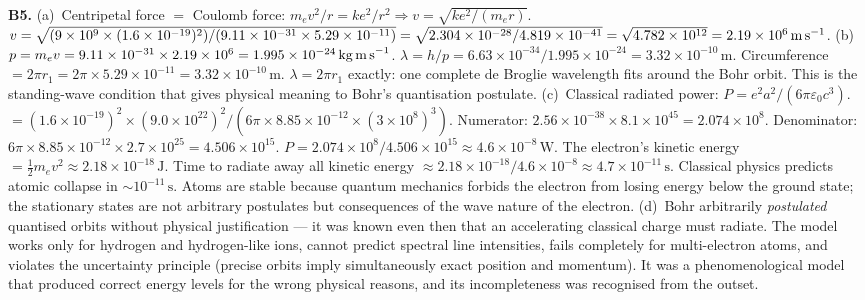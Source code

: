 \textbf{B5.}
(a)~Centripetal force $=$ Coulomb force:
$m_ev^2/r=ke^2/r^2\Rightarrow v=\sqrt{ke^2/(m_er)}$.
$v=\sqrt{(9\times10^9\times(1.6\times10^{-19})^2)/
(9.11\times10^{-31}\times5.29\times10^{-11})}
=\sqrt{2.304\times10^{-28}/4.819\times10^{-41}}
=\sqrt{4.782\times10^{12}}
=2.19\times10^6\,\text{m\,s}^{-1}$. \quad
(b)~$p=m_ev=9.11\times10^{-31}\times2.19\times10^6
=1.995\times10^{-24}\,\text{kg\,m\,s}^{-1}$.
$\lambda=h/p=6.63\times10^{-34}/1.995\times10^{-24}
=3.32\times10^{-10}\,\text{m}$.
Circumference $=2\pi r_1
=2\pi\times5.29\times10^{-11}
=3.32\times10^{-10}\,\text{m}$.
$\lambda=2\pi r_1$ exactly: one complete de Broglie
wavelength fits around the Bohr orbit. This is the
standing-wave condition that gives physical meaning to
Bohr's quantisation postulate. \quad
(c)~Classical radiated power:
$P=e^2a^2/(6\pi\varepsilon_0c^3)$.
$=(1.6\times10^{-19})^2\times(9.0\times10^{22})^2/
(6\pi\times8.85\times10^{-12}\times(3\times10^8)^3)$.
Numerator: $2.56\times10^{-38}\times8.1\times10^{45}
=2.074\times10^8$.
Denominator: $6\pi\times8.85\times10^{-12}
\times2.7\times10^{25}=4.506\times10^{15}$.
$P=2.074\times10^8/4.506\times10^{15}
\approx4.6\times10^{-8}\,\text{W}$.
The electron's kinetic energy $=\tfrac{1}{2}m_ev^2
\approx2.18\times10^{-18}\,\text{J}$.
Time to radiate away all kinetic energy
$\approx2.18\times10^{-18}/4.6\times10^{-8}
\approx4.7\times10^{-11}\,\text{s}$.
Classical physics predicts atomic collapse in
$\sim10^{-11}\,\text{s}$. Atoms are stable because
quantum mechanics forbids the electron from losing
energy below the ground state; the stationary states
are not arbitrary postulates but consequences of the
wave nature of the electron. \quad
(d)~Bohr arbitrarily \textit{postulated} quantised
orbits without physical justification --- it was known
even then that an accelerating classical charge must
radiate. The model works only for hydrogen and
hydrogen-like ions, cannot predict spectral line
intensities, fails completely for multi-electron atoms,
and violates the uncertainty principle (precise orbits
imply simultaneously exact position and momentum).
It was a phenomenological model that produced correct
energy levels for the wrong physical reasons, and its
incompleteness was recognised from the outset.

\endgroup


